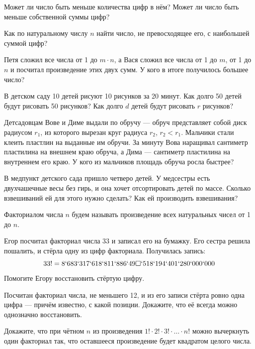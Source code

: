\begin{itemize}
\itA Может ли число быть меньше количества цифр в нём? Может ли число быть меньше собственной суммы цифр?

\itB Как по натуральному числу $n$ найти число, не превосходящее его, с наибольшей суммой цифр?

\itC Петя сложил все числа от 1 до $m \cdot n$, а Вася сложил все числа от 1 до $m$, от 1 до $n$ и посчитал произведение этих двух сумм. У кого в итоге получилось большее число?
\end{itemize}

\begin{itemize}
\itA В детском саду 10 детей рисуют 10 рисунков за 20 минут. Как долго 50 детей будут рисовать 50 рисунков? Как долго $d$ детей будут рисовать $r$ рисунков?

\itB Детсадовцам Вове и Диме выдали по обручу — обруч представляет собой диск радиусом $r_1$, из которого вырезан круг радиуса $r_2$, $r_2<r_1$. Мальчики стали клеить пластлин на выданные им обручи. За минуту Вова наращивал сантиметр пластилина на внешнем краю обруча, а Дима — сантиметр пластилина на внутреннем его краю. У кого из мальчиков площадь обруча росла быстрее?

\itC В медпункт детского сада пришло четверо детей. У медсестры есть двухчашечные весы без гирь, и она хочет отсортировать детей по массе. Сколько взвешиваний ей для этого нужно сделать? Как ей производить взвешивания?
\end{itemize}

Факториалом числа $n$ будем называть произведение всех натуральных чисел от 1 до $n$.

\begin{itemize}
\itA Егор посчитал факториал числа 33 и записал его на бумажку. Его сестра решила пошалить, и стёрла одну из цифр факториала. Получилась запись:
	$$33! = 8`683`317`618`811`886`49\square`518`194`401`280`000`000$$
Помогите Егору восстановить стёртую цифру.

\itB Посчитан факториал числа, не меньшего 12, и из его записи стёрта ровно одна цифра — причём известно, с какой позиции. Докажите, что её всегда можно однозначно восстановить.

\itC Докажите, что при чётном $n$ из произведения $1! \cdot 2! \cdot 3! \cdot \ldots \cdot n!$ можно вычеркнуть один факториал так, что оставшееся произведение будет квадратом целого числа.
\end{itemize}

